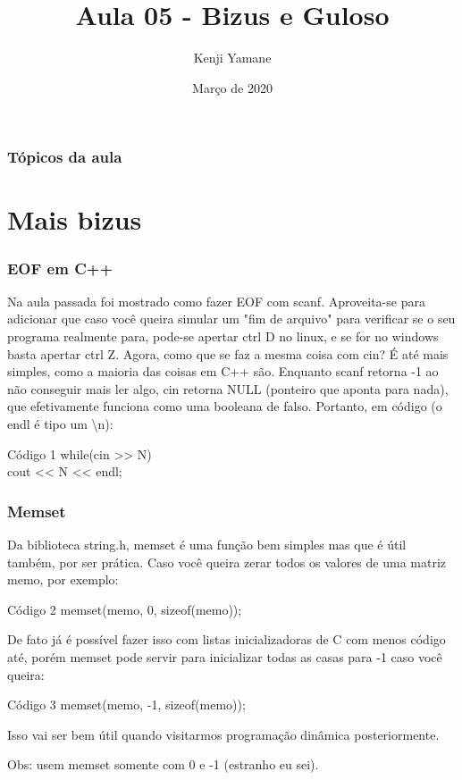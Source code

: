 \documentclass{beamer}
\title[Apresentação]{Aula 05 - Bizus e Guloso}
\author[\textit{Kenji Yamane}]{Kenji Yamane}
\date{Março de 2020}
\begin{document}
\begin{frame}

\titlepage


\end{frame}

\begin{frame}

\frametitle{Tópicos da aula}

\tableofcontents

\end{frame}

\section{Mais bizus}
	
	\begin{frame}
	\frametitle{EOF em C++}
		Na aula passada foi mostrado como fazer EOF com scanf.
		Aproveita-se para adicionar que caso você queira simular um
		"fim de arquivo" para verificar se o seu programa realmente
		para, pode-se apertar ctrl D no linux, e se for no windows basta
		apertar ctrl Z. Agora, como que se faz a mesma coisa com cin?
		É até mais simples, como a maioria das coisas em C++ são.
		Enquanto scanf retorna -1 ao não conseguir mais ler algo, cin
		retorna NULL (ponteiro que aponta para nada), que
		efetivamente funciona como uma booleana de falso. Portanto,
		em código (o endl é tipo um \textbackslash n):
		\begin{block}{Código 1}
		\hspace{10 pt} while(cin >> N)\\
		\hspace{20 pt} cout << N << endl;
		\end{block}
	\end{frame}

	\begin{frame}
	\frametitle{Memset}
		Da biblioteca string.h, memset é uma função bem simples
		mas que é útil também, por ser prática. Caso você queira zerar
		todos os valores de uma matriz memo, por exemplo:
		\begin{block}{Código 2}
		\hspace{10 pt} memset(memo, 0, sizeof(memo));
		\end{block}
		De fato já é possível fazer isso com listas inicializadoras de
		C com menos código até, porém memset pode servir para
		inicializar todas as casas para -1 caso você queira:
		\begin{block}{Código 3}
		\hspace{10 pt} memset(memo, -1, sizeof(memo));
		\end{block}
		Isso vai ser bem útil quando visitarmos programação
		dinâmica posteriormente.

		Obs: usem memset somente com 0 e -1 (estranho eu sei).
	\end{frame}
\end{document}
